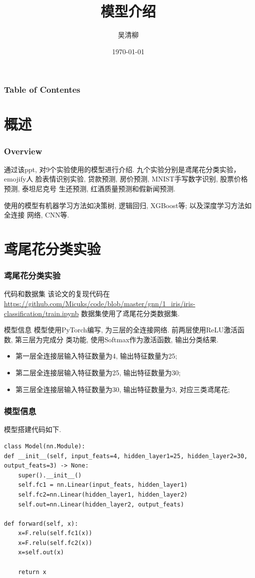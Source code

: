 \documentclass{beamer}
\title{模型介绍}
\author{吴清柳}
\institute{Beijing University of Posts and Telecommunications}
\date{\today}
\begin{document}
\AtBeginSection{\tableofcontents[currentsection]}
\maketitle

\begin{frame}
	\frametitle{Table of Contentes}
	\tableofcontents
\end{frame}

\section{概述}
\begin{frame}
	\frametitle{Overview}
	通过该ppt, 对9个实验使用的模型进行介绍. 九个实验分别是鸢尾花分类实验，emojify人
	脸表情识别实验, 贷款预测, 房价预测, MNIST手写数字识别, 股票价格预测, 泰坦尼克号
	生还预测, 红酒质量预测和假新闻预测.

	使用的模型有机器学习方法如决策树, 逻辑回归, XGBoost等; 以及深度学习方法如全连接
	网络, CNN等.
\end{frame}

\section{鸢尾花分类实验}
\begin{frame}[fragile]
	\frametitle{鸢尾花分类实验}
	\begin{block}{代码和数据集}
		该论文的复现代码在\href{这里}{https://github.com/Micuks/code/blob/master/gnn/1\_iris/iris-classification/train.ipynb}
		数据集使用了鸢尾花分类数据集.
	\end{block}

	\begin{block}{模型信息}
		模型使用PyTorch编写, 为三层的全连接网络. 前两层使用ReLU激活函数, 第三层为完成分
		类功能, 使用Softmax作为激活函数, 输出分类结果.
		\begin{itemize}
			\item 第一层全连接层输入特征数量为4, 输出特征数量为25;
			\item 第二层全连接层输入特征数量为25, 输出特征数量为30;
			\item 第三层全连接层输入特征数量为30, 输出特征数量为3, 对应三类鸢尾花;
		\end{itemize}
	\end{block}
\end{frame}

\begin{frame}[fragile]
	\frametitle{模型信息}
	模型搭建代码如下.
	\begin{verbatim}
class Model(nn.Module):
def __init__(self, input_feats=4, hidden_layer1=25, hidden_layer2=30, output_feats=3) -> None:
	super().__init__()
	self.fc1 = nn.Linear(input_feats, hidden_layer1)
	self.fc2=nn.Linear(hidden_layer1, hidden_layer2)
	self.out=nn.Linear(hidden_layer2, output_feats)

def forward(self, x):
	x=F.relu(self.fc1(x))
	x=F.relu(self.fc2(x))
	x=self.out(x)

	return x
	\end{verbatim}
\end{frame}
\end{document}
